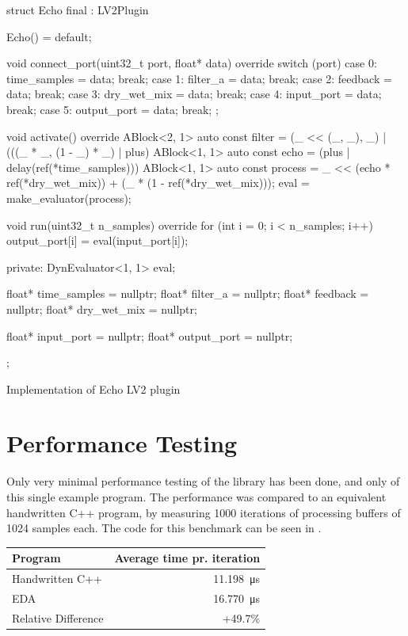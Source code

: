 \begin{listing}
  \begin{cppcodenl}
  struct Echo final : LV2Plugin {
    Echo() = default;

    void connect_port(uint32_t port, float* data) override
    {
      switch (port) {
        case 0: time_samples = data; break;
        case 1: filter_a = data; break;
        case 2: feedback = data; break;
        case 3: dry_wet_mix = data; break;
        case 4: input_port = data; break;
        case 5: output_port = data; break;
      }
    };

    void activate() override
    {
      ABlock<2, 1> auto const filter = (_ << (_, _), _) | (((_ * _, (1 - _) * _) | plus) %
      ABlock<1, 1> auto const echo = (plus | delay(ref(*time_samples))) %
      ABlock<1, 1> auto const process = _ << (echo * ref(*dry_wet_mix)) + (_ * (1 - ref(*dry_wet_mix)));
      eval = make_evaluator(process);
    }

    void run(uint32_t n_samples) override
    {
      for (int i = 0; i < n_samples; i++) {
        output_port[i] = eval(input_port[i]);
      }
    }
    
  private:
    DynEvaluator<1, 1> eval;

    float* time_samples = nullptr;
    float* filter_a = nullptr;
    float* feedback = nullptr;
    float* dry_wet_mix = nullptr;
    
    float* input_port = nullptr;
    float* output_port = nullptr;
  };
  \end{cppcodenl}
  \caption{Implementation of Echo LV2 plugin}
  \label{lst:echo_lv2}
\end{listing}

\section{Performance Testing}

Only very minimal performance testing of the library has been done, and only of this single example program.
The performance was compared to an equivalent handwritten C++ program, by measuring 1000 iterations of
processing buffers of 1024 samples each. The code for this benchmark can be seen in .

\begin{table}[H]
  \centering
  \begin{tabular}{|l|r|}
    \hline
    Program             & Average time pr. iteration \\
    \hline\hline
    Handwritten C++     & \SI{11.198}{\micro\second} \\
    EDA                 & \SI{16.770}{\micro\second} \\
    \hline\hline
    Relative Difference & +49.7\%                    \\
    \hline
  \end{tabular}
\end{table}


